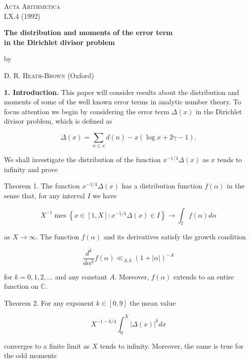 \documentclass[10pt]{article}
\newcommand{\articleSection}[2]{%
  \par\medskip\noindent\textbf{#1. #2.}\enspace
}
\begin{document}
\vspace*{-2em}
\begin{flushleft}
\textsc{Acta Arithmetica}\\
LX.4 (1992)
\end{flushleft}

\vspace{4em}
\begin{center}
{\LARGE\bfseries The distribution and moments of the error term\\
in the Dirichlet divisor problem\par}
\vspace{1.5em}
{\normalsize by\par}
\vspace{0.8em}
{\large\textsc{D. R. Heath-Brown} (Oxford)\par}
\end{center}
\vspace{2.5em}

\articleSection{1}{Introduction}This paper will consider results about the distribution and moments of some of the well known error terms in analytic number theory. To focus attention we begin by considering the error term $\Delta(x)$ in the Dirichlet divisor problem, which is defined as

$$
\Delta(x)=\sum_{n \leq x} d(n)-x(\log x+2 \gamma-1) .
$$

We shall investigate the distribution of the function $x^{-1 / 4} \Delta(x)$ as $x$ tends to infinity and prove

Theorem 1. The function $x^{-1 / 4} \Delta(x)$ has a distribution function $f(\alpha)$ in the sense that, for any interval $I$ we have

$$
X^{-1} \operatorname{mes}\left\{x \in[1, X]: x^{-1 / 4} \Delta(x) \in I\right\} \rightarrow \int_{I} f(\alpha) d \alpha
$$

as $X \rightarrow \infty$. The function $f(\alpha)$ and its derivatives satisfy the growth condition

$$
\frac{d^{k}}{d \alpha^{k}} f(\alpha) \ll_{A, k}(1+|\alpha|)^{-A}
$$

for $k=0,1,2, \ldots$ and any constant $A$. Moreover, $f(\alpha)$ extends to an entire function on $\mathbb{C}$.

Theorem 2. For any exponent $k \in[0,9]$ the mean value

$$
X^{-1-k / 4} \int_{0}^{X}|\Delta(x)|^{k} d x
$$

converges to a finite limit as $X$ tends to infinity. Moreover, the same is true for the odd moments
\end{document}
